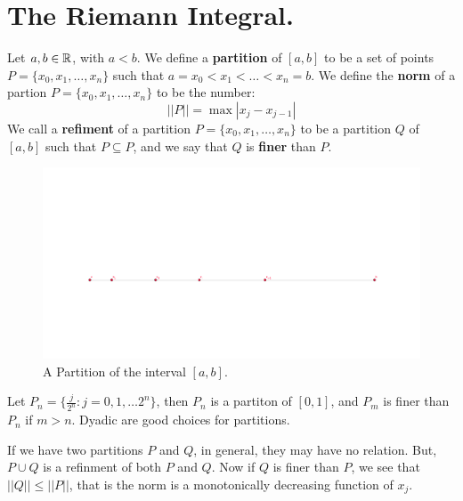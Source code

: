 

\section{The Riemann Integral.}

\begin{definition}
    Let $a,b \in \mathbb{R}$, with  $a<b$. We define a  \textbf{partition} of $[a,b]$ to be a set of points $P=\{x_0,x_1, \dots, x_n\}$ such that $a=x_0<x_1< \dots <x_n=b$.
    We define the \textbf{norm} of a partion $P=\{x_0,x_1, \dots, x_n\}$ to be the number:
    \begin{equation}
        ||P||=\max|x_j-x_{j-1}|
    \end{equation} 
    We call a \textbf{refiment} of a partition $P=\{x_0,x_1, \dots, x_n\}$ to be a partition $Q$ of  $[a,b]$ such that  $P \subseteq P$, and we say that $Q$ is  \textbf{finer} than $P$.
\end{definition}

\begin{figure}	
    \centering
    \includegraphics[scale = 0.3]{figures/partitionOfAnInterval.png}
    \caption{A Partition of the interval $[a,b]$.}
    \label{fig_5.1}
\end{figure}

\begin{example}
    Let $P_n=\{\frac{j}{2^n}: j=0,1, \dots 2^n\}$, then $P_n$ is a partiton of  $[0,1]$, and  $P_m$ is finer than  $P_n$ if  $m>n$.
    Dyadic are good choices for partitions.
\end{example} 

If we have two partitions $P$ and  $Q$, in general, they may have no relation. But, $P \cup Q$ is a refinment of both  $P$ and  $Q$. Now if  $Q$ is finer than $P$, we see that  $||Q|| \leq ||P||$, that is the norm is a monotonically decreasing function of  $x_j$.

